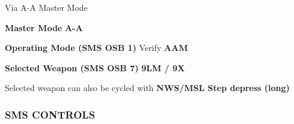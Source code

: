 \begin{tcoloritemize}
{    Via A-A Master Mode

    \begin{subenumerate}
        \item \textbf{Master Mode} \dotfill \textbf{A-A}
        \item \textbf{Operating Mode (SMS OSB 1)} \dotfill Verify \textbf{AAM}
        \item \textbf{Selected Weapon (SMS OSB 7)} \dotfill \textbf{9LM / 9X}
    \end{subenumerate}
    
    Selected weapon can also be cycled with \textbf{NWS/MSL Step depress (long)}
    }
\end{tcoloritemize}
    
\subsubsection{SMS CONTROLS}

